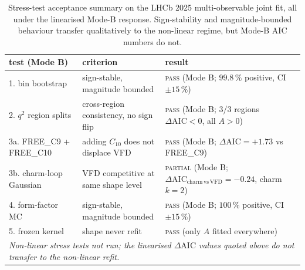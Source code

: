 \begin{table}[h]
\centering
\small
\begin{tabular}{lp{4.5cm}p{6.0cm}}
\toprule
test (Mode B) & criterion & result \\
\midrule
1. bin bootstrap                & sign-stable, magnitude bounded
                                & \textsc{pass} (Mode B; $99.8\,\%$ positive, CI $\pm 15\,\%$) \\
2. $q^{2}$ region splits        & cross-region consistency, no sign flip
                                & \textsc{pass} (Mode B; 3/3 regions $\Delta\mathrm{AIC}<0$, all $A>0$) \\
3a. FREE\_C9 + FREE\_C10        & adding $C_{10}$ does not displace VFD
                                & \textsc{pass} (Mode B; $\Delta\mathrm{AIC}=+1.73$ vs FREE\_C9) \\
3b. charm-loop Gaussian         & VFD competitive at same shape level
                                & \textsc{partial} (Mode B; $\Delta\mathrm{AIC}_{\mathrm{charm\,vs\,VFD}}=-0.24$, charm $k=2$) \\
4. form-factor MC               & sign-stable, magnitude bounded
                                & \textsc{pass} (Mode B; $100\,\%$ positive, CI $\pm 15\,\%$) \\
5. frozen kernel                & shape never refit
                                & \textsc{pass} (only $A$ fitted everywhere) \\
\midrule
\multicolumn{3}{p{12.0cm}}{\emph{Non-linear stress tests not run;
the linearised $\Delta\mathrm{AIC}$ values quoted above do not
transfer to the non-linear refit.}} \\
\bottomrule
\end{tabular}
\caption{Stress-test acceptance summary on the LHCb 2025
multi-observable joint fit, all under the linearised Mode-B response.
Sign-stability and magnitude-bounded behaviour transfer qualitatively
to the non-linear regime, but Mode-B AIC numbers do not.}
\label{tab:stress_accept}
\end{table}
